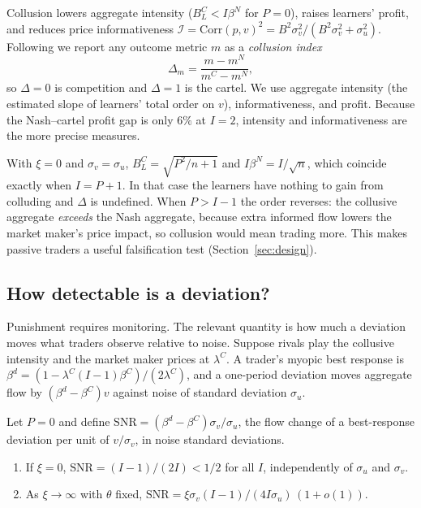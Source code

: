 Collusion lowers aggregate intensity ($B_L^C<I\beta^N$ for $P=0$), raises
learners' profit, and reduces price informativeness
$\mathcal I=\mathrm{Corr}(p,v)^2=B^2\sigma_v^2/(B^2\sigma_v^2+\sigma_u^2)$.
Following \citet{calvano2020} we report any outcome metric $m$ as a
\emph{collusion index}
\[
\Delta_m=\frac{m-m^N}{m^C-m^N},
\]
so $\Delta=0$ is competition and $\Delta=1$ is the cartel. We use aggregate
intensity (the estimated slope of learners' total order on $v$),
informativeness, and profit. Because the Nash--cartel profit gap is only
$6\%$ at $I=2$, intensity and informativeness are the more precise measures.

\begin{remark}\label{rem:passive}
With $\xi=0$ and $\sigma_v=\sigma_u$, $B_L^C=\sqrt{P^2/n+1}$ and
$I\beta^N=I/\sqrt n$, which coincide exactly when $I=P+1$. In that case the
learners have nothing to gain from colluding and $\Delta$ is undefined. When
$P>I-1$ the order reverses: the collusive aggregate \emph{exceeds} the Nash
aggregate, because extra informed flow lowers the market maker's price impact,
so collusion would mean trading more. This makes passive traders a useful
falsification test (Section~\ref{sec:design}).
\end{remark}

\subsection{How detectable is a deviation?}

Punishment requires monitoring. The relevant quantity is how much a deviation
moves what traders observe relative to noise. Suppose rivals play the collusive
intensity and the market maker prices at $\lambda^C$. A trader's myopic best
response is $\beta^d=(1-\lambda^C (I-1)\beta^C)/(2\lambda^C)$, and a one-period
deviation moves aggregate flow by $(\beta^d-\beta^C)v$ against noise of
standard deviation $\sigma_u$.

\begin{proposition}\label{prop:snr}
Let $P=0$ and define $\mathrm{SNR}=(\beta^d-\beta^C)\sigma_v/\sigma_u$, the
flow change of a best-response deviation per unit of $v/\sigma_v$, in noise
standard deviations.
\begin{enumerate}
\item If $\xi=0$, $\mathrm{SNR}=(I-1)/(2I)<1/2$ for all $I$, independently of
$\sigma_u$ and $\sigma_v$.
\item As $\xi\to\infty$ with $\theta$ fixed, $\mathrm{SNR}=\xi\sigma_v(I-1)/(4I\sigma_u)\,(1+o(1))$.
\end{enumerate}
\end{proposition}

